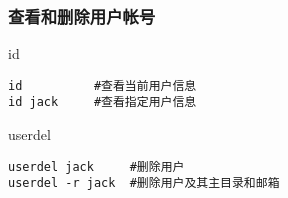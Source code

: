 \documentclass[xcolor=svgnames,presentation]{beamer}
\begin{document}
\begin{frame}[fragile]
\frametitle{查看和删除用户帐号}
\label{sec-1-3-4}
\begin{exampleblock}{id}
\label{sec-1-3-4-1}


\begin{verbatim}
id          #查看当前用户信息
id jack     #查看指定用户信息
\end{verbatim}
\end{exampleblock}
\begin{block}{userdel}
\label{sec-1-3-4-2}


\begin{verbatim}
userdel jack     #删除用户
userdel -r jack  #删除用户及其主目录和邮箱
\end{verbatim}
\end{block}
\end{frame}
\end{document}
